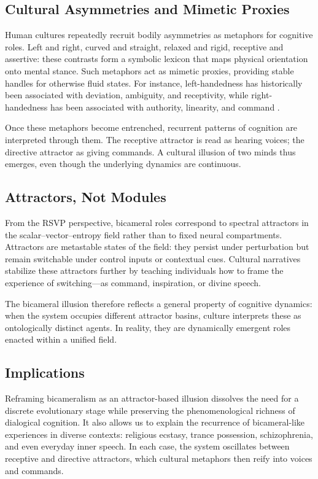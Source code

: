 \documentclass[a4paper,11pt]{article}
\begin{document}
\subsection{Cultural Asymmetries and Mimetic Proxies}
Human cultures repeatedly recruit bodily asymmetries as metaphors for cognitive roles. Left and right, curved and straight, relaxed and rigid, receptive and assertive: these contrasts form a symbolic lexicon that maps physical orientation onto mental stance. Such metaphors act as mimetic proxies, providing stable handles for otherwise fluid states. For instance, left-handedness has historically been associated with deviation, ambiguity, and receptivity, while right-handedness has been associated with authority, linearity, and command \citep{McManus2002}.

Once these metaphors become entrenched, recurrent patterns of cognition are interpreted through them. The receptive attractor is read as hearing voices; the directive attractor as giving commands. A cultural illusion of two minds thus emerges, even though the underlying dynamics are continuous.

\subsection{Attractors, Not Modules}
From the RSVP perspective, bicameral roles correspond to spectral attractors in the scalar--vector--entropy field rather than to fixed neural compartments. Attractors are metastable states of the field: they persist under perturbation but remain switchable under control inputs or contextual cues. Cultural narratives stabilize these attractors further by teaching individuals how to frame the experience of switching—as command, inspiration, or divine speech.

The bicameral illusion therefore reflects a general property of cognitive dynamics: when the system occupies different attractor basins, culture interprets these as ontologically distinct agents. In reality, they are dynamically emergent roles enacted within a unified field.

\subsection{Implications}
Reframing bicameralism as an attractor-based illusion dissolves the need for a discrete evolutionary stage while preserving the phenomenological richness of dialogical cognition. It also allows us to explain the recurrence of bicameral-like experiences in diverse contexts: religious ecstasy, trance possession, schizophrenia, and even everyday inner speech. In each case, the system oscillates between receptive and directive attractors, which cultural metaphors then reify into voices and commands.
\end{document}
